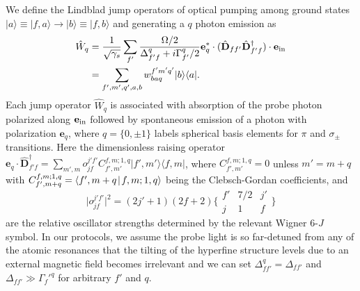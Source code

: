 \documentclass[preprint,aps,pra,onecolumn,superscriptaddress]{revtex4-1} %
\def\bra#1{\langle{#1}\rvert}%
\def\ket#1{\lvert{#1}\rangle}%
\def\Braket#1#2{\mathinner{\langle{#1}\! \mid\! {#2} \rangle}}
\begin{document}
\begin{appendix}
We define the Lindblad jump operators of optical pumping among ground states $\ket{a}\equiv \ket{f,a} \rightarrow \ket{b}\equiv \ket{f,b}$ and generating a $q$ photon emission as~\cite{Deutsch2010a}
	\begin{align}\label{Eq::Wq_Faraday}
		\hat{W}_q &= \frac{1}{\sqrt{\gamma_s}}\sum_{f'}\frac{\Omega/2}{\Delta_{f'f}^q+i\Gamma_{f'}^q/2}\mathbf{e}_q^*\cdot(\hat{\mathbf{D}}_{ff'}  \hat{\mathbf{D}}^\dagger_{f'f} )\cdot\mathbf{e}_{\rm in}\\
		&=\sum_{f',m',q',a,b} w_{baq }^{f'm'q'}\ket{b}\bra{a}.
	\end{align}
Each jump operator $\hat{W}_q$ is associated with absorption of the probe photon polarized along $ \mathbf{e}_{\rm in} $ followed by spontaneous emission of a photon with polarization $ \mathbf{e}_q $, where $q= \{0,\pm 1\}$ labels spherical basis elements for $\pi$ and $ \sigma_\pm$ transitions. 
Here the dimensionless raising operator $ \mathbf{e}_q\cdot\hat{\mathbf{D}}_{f'f}^\dagger= \sum_{m',m} o_{jf}^{j'f'} C_{f',m'}^{f,m;1, q}\ket{f',m'}\bra{f,m} $,
where $ C_{f',m'}^{f,m;1, q}=0 $ unless $ m'=m+q $ with $ C_{f',m+q}^{f,m;1, q}=\Braket{f',m+q}{f,m;1,q}$ being the Clebsch-Gordan coefficients, and
\begin{equation}
\big| o_{jf}^{j'f'} \big|^2=(2j'+1)(2f+2) \bigg\{
\begin{array}{ccc}
f' & 7/2 & j' \\
 j & 1 & f
 \end{array}
 \bigg\}
\end{equation}
are the relative oscillator strengths determined by the relevant Wigner 6-$J$ symbol.
In our protocols, we assume the probe light is so far-detuned from any of the atomic resonances that the tilting of the hyperfine structure levels due to an external magnetic field becomes irrelevant and we can set $ \Delta_{ff'}^q=\Delta_{ff'} $ and $ \Delta_{ff'}\gg \Gamma_f'^q $ for arbitrary $ f' $ and $ q $.



\end{appendix}
\end{document}
